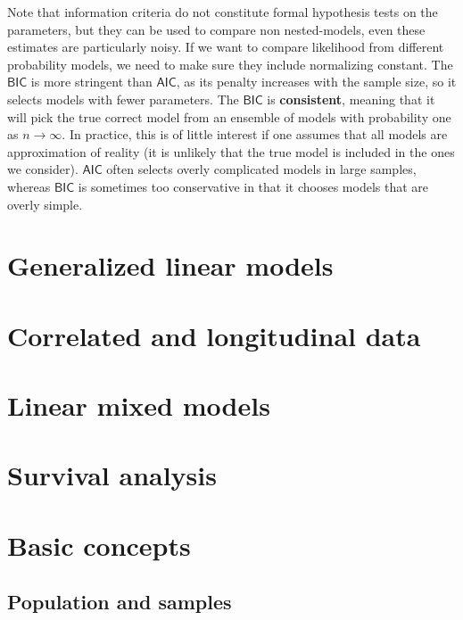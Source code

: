 \documentclass[
  11pt,
  letterpaper,
]{book}
\theoremstyle{definition}
\theoremstyle{definition}
\theoremstyle{definition}
\theoremstyle{remark}
\begin{document}
Note that information criteria do not constitute formal hypothesis tests on the parameters, but they can be used to compare non nested-models, even these estimates are particularly noisy. If we want to compare likelihood from different probability models, we need to make sure they include normalizing constant. The \(\mathsf{BIC}\) is more stringent than \(\mathsf{AIC}\), as its penalty increases with the sample size, so it selects models with fewer parameters. The \(\mathsf{BIC}\) is \textbf{consistent}, meaning that it will pick the true correct model from an ensemble of models with probability one as \(n \to \infty\). In practice, this is of little interest if one assumes that all models are approximation of reality (it is unlikely that the true model is included in the ones we consider). \(\mathsf{AIC}\) often selects overly complicated models in large samples, whereas \(\mathsf{BIC}\) is sometimes too conservative in that it chooses models that are overly simple.

\hypertarget{generalized-linear-models}{%
\chapter{Generalized linear models}\label{generalized-linear-models}}

\hypertarget{correlated-longitudinal-data}{%
\chapter{Correlated and longitudinal data}\label{correlated-longitudinal-data}}

\hypertarget{linear-mixed-models}{%
\chapter{Linear mixed models}\label{linear-mixed-models}}

\hypertarget{survival}{%
\chapter{Survival analysis}\label{survival}}

\hypertarget{complement}{%
\chapter{Basic concepts}\label{complement}}

\hypertarget{population-sample}{%
\section{Population and samples}\label{population-sample}}
\end{document}
